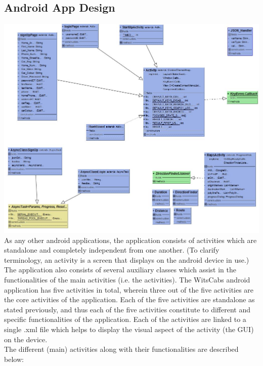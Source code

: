 \documentclass[a4paper,12pt]{article}
\begin{document}
\subsection{Android App Design}
\includegraphics[scale=0.5]{AndroidAppUML}\\
As any other android applications, the application consists of activities which are standalone and
completely independent from one another. (To clarify terminology, an activity is a screen that displays on
the android device in use.) The application also consists of several auxiliary classes which assist in the
functionalities of the main activities (i.e. the activities).
The WitsCabs android application has five activities in total, wherein three out of the five activities are the
core activities of the application. Each of the five activities are standalone as stated previously, and thus
each of the five activities constitute to different and specific functionalities of the application. Each of
the activities are linked to a single .xml file which helps to display the visual aspect of the activity (the
GUI) on the device.\\The different (main) activities along with their functionalities are described below:
\end{document}
